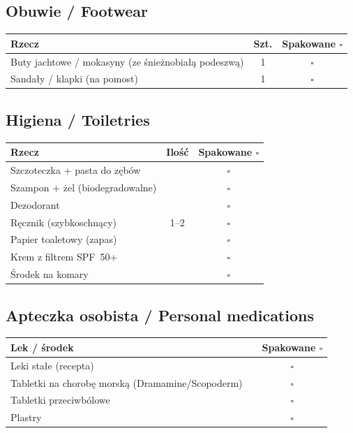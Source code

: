 \documentclass[a4paper,11pt]{article}
\begin{document}
\subsection*{Obuwie / Footwear}
\begin{tabularx}{\linewidth}{|X|c|c|}
\hline
\textbf{Rzecz} & \textbf{Szt.} & \textbf{Spakowane \(\square\)} \\
\hline
Buty jachtowe / mokasyny (ze śnieżnobiałą podeszwą) & 1 & \(\square\) \\[4pt]\hline
Sandały / klapki (na pomost) & 1 & \(\square\) \\[4pt]\hline
\end{tabularx}

\vspace{0.3cm}

\subsection*{Higiena / Toiletries}
\begin{tabularx}{\linewidth}{|X|c|c|}
\hline
\textbf{Rzecz} & \textbf{Ilość} & \textbf{Spakowane \(\square\)} \\
\hline
Szczoteczka + pasta do zębów & & \(\square\) \\[4pt]\hline
Szampon + żel (biodegradowalne) & & \(\square\) \\[4pt]\hline
Dezodorant & & \(\square\) \\[4pt]\hline
Ręcznik (szybkoschnący) & 1--2 & \(\square\) \\[4pt]\hline
Papier toaletowy (zapas) & & \(\square\) \\[4pt]\hline
Krem z filtrem SPF~50+ & & \(\square\) \\[4pt]\hline
Środek na komary & & \(\square\) \\[4pt]\hline
\end{tabularx}

\vspace{0.3cm}

\subsection*{Apteczka osobista / Personal medications}
\begin{tabularx}{\linewidth}{|X|c|c|}
\hline
\textbf{Lek / środek} & & \textbf{Spakowane \(\square\)} \\
\hline
Leki stałe (recepta) & & \(\square\) \\[4pt]\hline
Tabletki na chorobę morską (Dramamine/Scopoderm) & & \(\square\) \\[4pt]\hline
Tabletki przeciwbólowe & & \(\square\) \\[4pt]\hline
Plastry & & \(\square\) \\[4pt]\hline
\end{tabularx}
\end{document}
